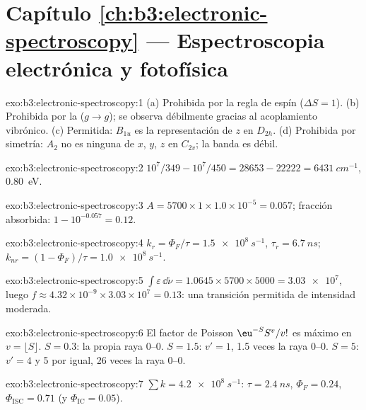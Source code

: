 \section*{Capítulo \ref{ch:b3:electronic-spectroscopy} --- Espectroscopia electrónica y fotofísica}

\begin{solution}{exo:b3:electronic-spectroscopy:1}
(a) Prohibida por la regla de espín ($\Delta S = 1$). (b) Prohibida por la 
($g \to g$); se observa débilmente gracias al acoplamiento vibrónico. (c) Permitida: $B_{1u}$ es la
representación de $z$ en $D_{2h}$. (d) Prohibida por simetría: $A_2$ no es ninguna de $x$,
$y$, $z$ en $C_{2v}$; la banda es débil.
\end{solution}

\begin{solution}{exo:b3:electronic-spectroscopy:2}
$10^7/349 - 10^7/450 = 28653 - 22222 = \qty{6431}{cm^{-1}}$, \qty{0.80}{eV}.
\end{solution}

\begin{solution}{exo:b3:electronic-spectroscopy:3}
$A = 5700 \times 1 \times 1.0\times10^{-5} = 0.057$; fracción absorbida: $1 - 10^{-0.057} =
0.12$.
\end{solution}

\begin{solution}{exo:b3:electronic-spectroscopy:4}
$k_r = \Phi_F/\tau = \qty{1.5e8}{s^{-1}}$, $\tau_r = \qty{6.7}{ns}$; $k_{nr} = (1 - \Phi_F)/\tau
= \qty{1.0e8}{s^{-1}}$.
\end{solution}

\begin{solution}{exo:b3:electronic-spectroscopy:5}
$\int\varepsilon\,\dd\tilde\nu = 1.0645 \times 5700 \times 5000 = \num{3.03e7}$, luego $f \approx
4.32\times10^{-9} \times 3.03\times10^7 = 0.13$: una transición permitida de intensidad
moderada.
\end{solution}

\begin{solution}{exo:b3:electronic-spectroscopy:6}
El factor de Poisson $\eu^{-S}S^v/v!$ es máximo en $v = \lfloor S\rfloor$. $S = 0.3$: la propia
raya 0--0. $S = 1.5$: $v' = 1$, 1.5 veces la raya 0--0. $S = 5$: $v' = 4$
y 5 por igual, 26 veces la raya 0--0.
\end{solution}

\begin{solution}{exo:b3:electronic-spectroscopy:7}
$\sum k = \qty{4.2e8}{s^{-1}}$: $\tau = \qty{2.4}{ns}$, $\Phi_F = 0.24$, $\Phi_{\mathrm{ISC}} = 0.71$
(y $\Phi_{\mathrm{IC}} = 0.05$).
\end{solution}

